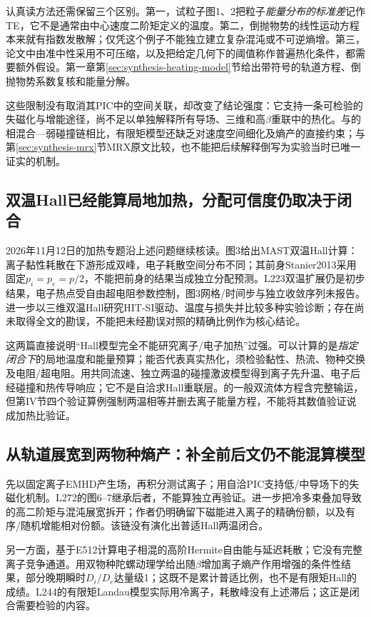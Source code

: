 认真读方法还需保留三个区别。第一，试粒子图1、2把粒子\emph{能量分布的标准差}记作TE，它不是通常由中心速度二阶矩定义的温度。第二，倒抛物势的线性运动方程本来就有指数发散解；仅凭这个例子不能独立建立复杂混沌或不可逆熵增。第三，论文中由准中性采用不可压缩，以及把给定几何下的阈值称作普遍热化条件，都需要额外假设。第一章第\ref{sec:synthesis-heating-model}节给出带符号的轨道方程、倒抛物势系数复核和能量分解。

这些限制没有取消其PIC中的空间关联，却改变了结论强度：它支持一条可检验的失磁化与增能途径，尚不足以单独解释所有导场、三维和高$\beta$重联中的热化。与\citet{E512}的相混合—弱碰撞链相比，有限矩模型还缺乏对速度空间细化及熵产的直接约束；与第\ref{sec:synthesis-mrx}节MRX原文比较，也不能把后续解释倒写为实验当时已唯一证实的机制。

\subsection{双温Hall已经能算局地加热，分配可信度仍取决于闭合}
2026年11月12日的加热专题沿上述问题继续核读。\citet{L223}图3给出MAST双温Hall计算：离子黏性耗散在下游形成双峰，电子耗散空间分布不同；其前身Stanier2013采用固定$p_i=p_e=p/2$，不能把前身的结果当成独立分配预测。L223双温扩展仍是初步结果，电子热点受自由超电阻参数控制，图3网格/时间步与独立收敛序列未报告。\citet{Kaptanoglu2020}进一步以三维双温Hall研究HIT-SI驱动、温度与损失并比较多种实验诊断；存在尚未取得全文的勘误，不能把未经勘误对照的精确比例作为核心结论。

这两篇直接说明“Hall模型完全不能研究离子/电子加热”过强。可以计算的是\emph{指定闭合下}的局地温度和能量预算；能否代表真实热化，须检验黏性、热流、物种交换及电阻/超电阻。\citet{L164}用共同流速、独立两温的碰撞激波模型得到离子先升温、电子后经碰撞和热传导响应；它不是自洽求Hall重联层。\citet{L247}的一般双流体方程含完整输运，但第IV节四个验证算例强制两温相等并删去离子能量方程，不能将其数值验证说成加热比验证。

\subsection{从轨道展宽到两物种熵产：补全前后文仍不能混算模型}
\citet{Yoon2018Heating}先以固定离子EMHD产生场，再积分测试离子；\citet{F743}用自洽PIC支持低/中导场下的失磁化机制。L272的图6--7继承后者，不能算独立再验证。\citet{Yoon2023PhaseSpace}进一步把冷多束叠加导致的高二阶矩与混沌展宽拆开；作者仍明确留下磁能进入离子的精确份额，以及有序/随机增能相对份额。该链没有演化出普适Hall两温闭合。

另一方面，\citet{Loureiro2013Heating}基于E512计算电子相混的高阶Hermite自由能与延迟耗散；它没有完整离子竞争通道。\citet{Numata2015Heating}用双物种陀螺动理学给出随$\beta$增加离子熵产作用增强的条件性结果，部分晚期瞬时$D_i/D_e$达量级1；这既不是累计普适比例，也不是有限矩Hall的成绩。L244的有限矩Landau模型实际用冷离子，耗散峰没有上述滞后；这正是闭合需要检验的内容。\citep{L244}

